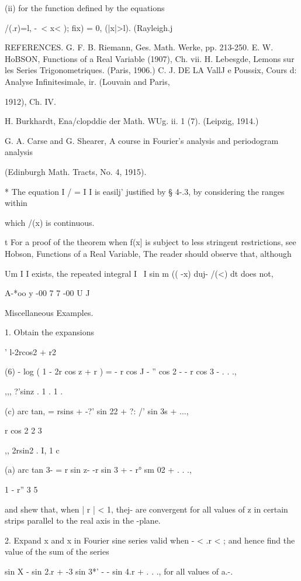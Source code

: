 {(ii) for the function defined by the equations

/(.r)=l, -\ < x< ); fix) = 0, (|x|>l). (Rayleigh.j

REFERENCES. G. F. B. Riemann, Ges. Math. Werke, pp. 213-250. E. W.
HoBSON, Functions of a Real Variable (1907), Ch. vii. H. Lebesgde,
Lemons sur les Series Trigonometriques. (Paris, 1906.) C. J. DE LA
VallJ e Poussix, Cours d: Analyse Infinitesimale, ir. (Louvain and
Paris,

1912), Ch. IV.

H. Burkhardt, Ena/clopddie der Math. WUg. ii. 1 (7). (Leipzig, 1914.)

G. A. Carse and G. Shearer, A course in Fourier's analysis and
periodogram analysis

(Edinburgh Math. Tracts, No. 4, 1915).

* The equation I / = I I is easilj' justified by § 4-.3, by
considering the ranges within

which /(x) is continuous.

t For a proof of the theorem when f(x] is subject to less stringent
restrictions, see Hobson, Functions of a Real Variable, %
The reader should observe that, although

Um I I exists, the repeated integral I \ I sin m (( -x) duj- /(<) dt
does not,

A-*oo y -00 7 7 -00 U J

%
%

Miscellaneous Examples.

1. Obtain the expansions

  ' l-2rcos2 + r2

(6) - log ( 1 - 2r cos z + r ) = - r cos J - '' cos 2 - - r cos 3 - .
. .,

,,, ?'sinz . 1 . 1 . \,

(c) arc tan, = rsins + -?' sin 22 + ?: /' sin 3s + ...,

   r cos 2 2 3

,, 2rsin2 . I,  1 c

(a) arc tan 3- = r sin z- -r sin 3 + - r° sm 02 + . . .,

1 - r'' 3 5

and shew that, when | r | < 1, thej- are convergent for all values of
z in certain strips parallel to the real axis in the -plane.

2. Expand x and x in Fourier sine series valid when - \pi < .r < \pi;
and hence find the value of the sum of the series

sin X - sin 2.r + -3 sin 3*' - - sin 4.r + . . ., for all values of
a.-. 

}
